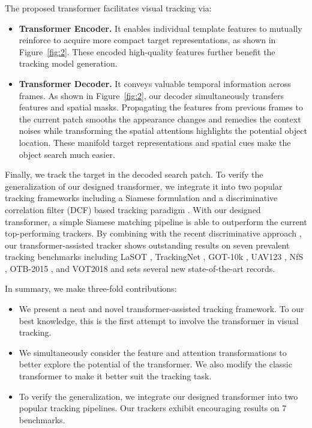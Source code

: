 \documentclass[10pt,twocolumn,letterpaper]{article}
\begin{document}
The proposed transformer facilitates visual tracking via:
\begin{itemize}[noitemsep,nolistsep]	
	\item {\bf Transformer Encoder.} It enables individual template features to mutually reinforce to acquire more compact target representations, as shown in Figure~\ref{fig:2}. 
These encoded high-quality features further benefit the tracking model generation.
	
	\item {\bf Transformer Decoder.} It conveys valuable temporal information across frames. As shown in Figure~\ref{fig:2}, our decoder simultaneously transfers features and spatial masks.
Propagating the features from previous frames to the current patch smooths the appearance changes and remedies the context noises while transforming the spatial attentions highlights the potential object location. 
These manifold target representations and spatial cues make the object search much easier.
\end{itemize}
Finally, we track the target in the decoded search patch. 
To verify the generalization of our designed transformer, we integrate it into two popular tracking frameworks including a Siamese formulation \cite{SiamFC} and a discriminative correlation filter (DCF) based tracking paradigm \cite{DiMP}.
With our designed transformer, a simple Siamese matching pipeline is able to outperform the current top-performing trackers.
By combining with the recent discriminative approach \cite{DiMP}, our transformer-assisted tracker shows outstanding results on seven prevalent tracking benchmarks including LaSOT \cite{LaSOT}, TrackingNet \cite{2018trackingnet}, GOT-10k \cite{GOT10k}, UAV123 \cite{UAV123}, NfS \cite{NFSdataset}, OTB-2015 \cite{OTB-2015}, and VOT2018 \cite{VOT2018}  and sets several new state-of-the-art records.



In summary, we make three-fold contributions:
\begin{itemize}[noitemsep,nolistsep]	
	\item We present a neat and novel transformer-assisted tracking framework. To our best knowledge, this is the first attempt to involve the transformer in visual tracking.	
	
	\item We simultaneously consider the feature and attention transformations to better explore the potential of the transformer. We also modify the classic transformer to make it better suit the tracking task.	
	
	\item To verify the generalization, we integrate our designed transformer into two popular tracking pipelines. Our trackers exhibit encouraging results on 7 benchmarks. \end{itemize}
\end{document}
